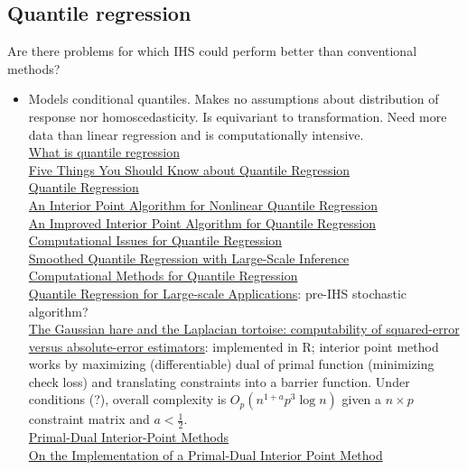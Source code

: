 \documentclass[10pt]{article}
\begin{document}
\subsection{Quantile regression}

Are there problems for which IHS could perform better than conventional methods?
\begin{itemize}

\item
Models conditional quantiles. Makes no assumptions about distribution of response nor homoscedasticity. Is equivariant to transformation. Need more data than linear regression and is computationally intensive. \\
\href{https://towardsdatascience.com/quantile-regression-ff2343c4a03}{What is quantile regression} \\
\href{https://support.sas.com/resources/papers/proceedings17/SAS0525-2017.pdf}{Five Things You Should Know about Quantile Regression} \\
\href{http://www.econ.uiuc.edu/~roger/research/rq/rq.pdf}{Quantile Regression} \\
\href{http://www.econ.uiuc.edu/~roger/research/nlrq/text/out.pdf}{An Interior Point Algorithm for Nonlinear Quantile Regression} \\
\href{https://ieeexplore.ieee.org/stamp/stamp.jsp?arnumber=9152027}{An Improved Interior Point Algorithm for Quantile Regression} \\
\href{https://www.jstor.org/stable/25053439}{Computational Issues for Quantile Regression} \\
\href{https://mathweb.ucsd.edu/~xip024/Papers/sqr_main.pdf}{Smoothed Quantile Regression with Large-Scale Inference} \\
\href{https://www.taylorfrancis.com/chapters/edit/10.1201/9781315120256-5/computational-methods-quantile-regression-roger-koenker}{Computational Methods for Quantile Regression} \\
\href{https://proceedings.mlr.press/v28/yang13f.pdf}{Quantile Regression for Large-scale Applications}: pre-IHS stochastic algorithm? \\

\href{https://projecteuclid.org/journals/statistical-science/volume-12/issue-4/The-Gaussian-hare-and-the-Laplacian-tortoise--computability-of/10.1214/ss/1030037960.full}{The Gaussian hare and the Laplacian tortoise: computability of squared-error versus absolute-error estimators}: implemented in R; interior point method works by maximizing (differentiable) dual of primal function (minimizing check loss) and translating constraints into a barrier function. Under conditions (?), overall complexity is $O_p(n^{1+a}p^3\log n)$ given a $n\times p$ constraint matrix and $a<\frac{1}{2}$. \\
\href{https://epubs.siam.org/doi/book/10.1137/1.9781611971453}{Primal-Dual Interior-Point Methods} \\
\href{https://epubs.siam.org/doi/abs/10.1137/0802028?journalCode=sjope8}{On the Implementation of a Primal-Dual Interior Point Method}


\end{itemize}
\end{document}
